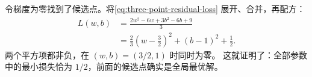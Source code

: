 \begin{example}[breakable=false,title={{\symboliconfont ★} 选读证明：为什么这是全局最小？}]
\label{proof:three-point-global-minimum}
令梯度为零找到了候选点。将\eqref{eq:three-point-residual-loss} 展开、合并，再配方：
\begin{equation}
\begin{aligned}
L(w,b)&=\frac{2w^2-6w+3b^2-6b+9}{3}\\
&=\frac23\left(w-\frac32\right)^2+(b-1)^2+\frac12.
\end{aligned}
\label{eq:three-point-loss-surface}
\end{equation}
两个平方项都非负，在 $(w,b)=(3/2,1)$ 时同时为零。
这就证明了：全部参数中的最小损失恰为 $1/2$，前面的候选点确实是全局最优解。
\end{example}
